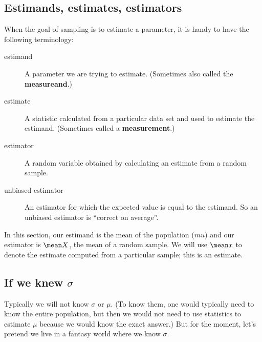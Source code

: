 \documentclass[twoside]{book}\usepackage[]{graphicx}\usepackage[]{xcolor}
\def\term#1{\textbf{#1}}
\begin{document}
\subsection{Estimands, estimates, estimators}

When the goal of sampling is to estimate a parameter, it is handy to have the 
following terminology:
\begin{description}
	\item[estimand] A parameter we are trying to estimate.  (Sometimes also called the 
		\term{measureand}.)

	\item[estimate] A statistic calculated from a particular data set and used to 
		estimate the estimand.  (Sometimes called a \term{measurement}.)

	\item[estimator] A random variable obtained by calculating an estimate 
		from a random sample.

	\item[unbiased estimator] An estimator for which the expected value is equal
		to the estimand.  So an unbiased estimator is ``correct on average''.
\end{description}
In this section, our estimand is the mean of the population ($mu$) and our estimator 
is $\mean X$, the mean of a random sample.  We will use $\mean x$ to denote 
the estimate computed from a particular sample; this is an estimate.

\subsection{If we knew $\sigma$}

Typically we will not know $\sigma$ or $\mu$.  (To know them, one would typically
need to know the entire population, but then we would not need to use statistics
to estimate $\mu$ because we would know the exact answer.)  But for the moment,
let's pretend we live in a fantasy world where we know $\sigma$.
\end{document}
